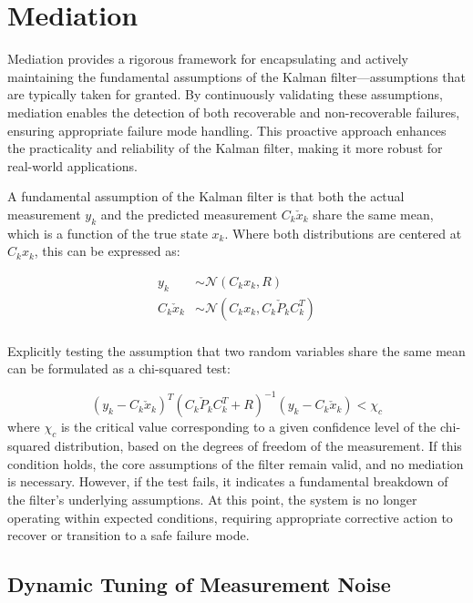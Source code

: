 \documentclass[a4paper]{article}
\begin{document}
	\section{Mediation}
	Mediation provides a rigorous framework for encapsulating and actively maintaining the fundamental assumptions of the Kalman filter—assumptions that are typically taken for granted. By continuously validating these assumptions, mediation enables the detection of both recoverable and non-recoverable failures, ensuring appropriate failure mode handling. This proactive approach enhances the practicality and reliability of the Kalman filter, making it more robust for real-world applications.


	A fundamental assumption of the Kalman filter is that both the actual measurement $y_k$ and the predicted measurement $C_k \check{x}_k$ share the same mean, which is a function of the true state $x_k$. Where both distributions are centered at $C_k x_k$, this can be expressed as:

	\begin{align}
		y_k &\sim \mathcal{N} (C_k x_k, R)\\
		C_k \check{x}_k &\sim \mathcal{N} (C_k x_k, C_k \check{P}_k C_k^T)\\
	\end{align}

	Explicitly testing the assumption that two random variables share the same mean can be formulated as a chi-squared test:

	\begin{equation}
		(y_k - C_k \check{x}_k)^T (C_k \check{P}_k C_k^T + R)^{-1} (y_k - C_k \check{x}_k) < \chi_c
		\label{eq:chisquare}
	\end{equation}
	where \( \chi_c \) is the critical value corresponding to a given confidence level of the chi-squared distribution, based on the degrees of freedom of the measurement. If this condition holds, the core assumptions of the filter remain valid, and no mediation is necessary. However, if the test fails, it indicates a fundamental breakdown of the filter’s underlying assumptions. At this point, the system is no longer operating within expected conditions, requiring appropriate corrective action to recover or transition to a safe failure mode.

\subsection{Dynamic Tuning of Measurement Noise}
\end{document}
